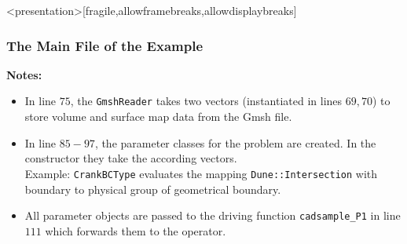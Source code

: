 \begin{frame}<presentation>[fragile,allowframebreaks,allowdisplaybreaks]
  \frametitle<presentation>{The Main File of the Example}
  
  \textbf{Notes:}
  \begin{itemize}
    \item In line $75$, the \lstinline!GmshReader! takes two vectors
      (instantiated in lines $69,70$) to store volume and surface map data from
      the Gmsh file.
    \item In line $85-97$, the parameter classes for the problem are created.
      In the constructor they take the according vectors.\\
      Example: \lstinline!CrankBCType! evaluates the mapping \lstinline!Dune::Intersection!
      with boundary to physical group of geometrical boundary.
    \item All parameter objects are passed to the driving function
      \lstinline!cadsample_P1! in line $111$ which forwards them to the operator.
  \end{itemize}
\end{frame}

